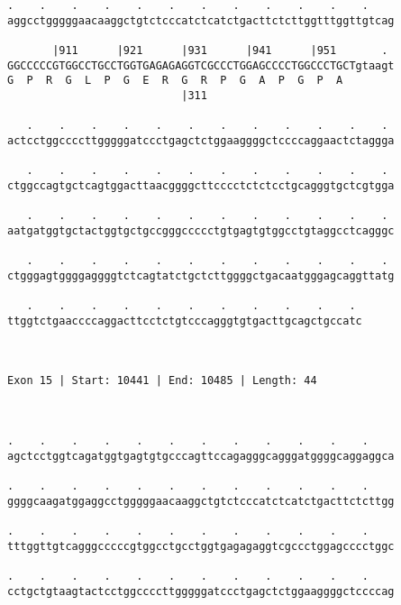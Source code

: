 \documentclass{article}
\begin{document}
\begin{Verbatim}
.    .    .    .    .    .    .    .    .    .    .    .    
aggcctgggggaacaaggctgtctcccatctcatctgacttctcttggtttggttgtcag
                                                            
       |911      |921      |931      |941      |951       . 
GGCCCCCGTGGCCTGCCTGGTGAGAGAGGTCGCCCTGGAGCCCCTGGCCCTGCTgtaagt
G  P  R  G  L  P  G  E  R  G  R  P  G  A  P  G  P  A        
                           |311                             
  
   .    .    .    .    .    .    .    .    .    .    .    . 
actcctggccccttgggggatccctgagctctggaaggggctccccaggaactctaggga
                                                            
   .    .    .    .    .    .    .    .    .    .    .    . 
ctggccagtgctcagtggacttaacggggcttcccctctctcctgcagggtgctcgtgga
                                                            
   .    .    .    .    .    .    .    .    .    .    .    . 
aatgatggtgctactggtgctgccgggccccctgtgagtgtggcctgtaggcctcagggc
                                                            
   .    .    .    .    .    .    .    .    .    .    .    . 
ctgggagtggggaggggtctcagtatctgctcttggggctgacaatgggagcaggttatg
                                                            
   .    .    .    .    .    .    .    .    .    .    . 
ttggtctgaaccccaggacttcctctgtcccagggtgtgacttgcagctgccatc
                                                       
                                                       
 
Exon 15 | Start: 10441 | End: 10485 | Length: 44



.    .    .    .    .    .    .    .    .    .    .    .    
agctcctggtcagatggtgagtgtgcccagttccagagggcagggatggggcaggaggca
                                                            
.    .    .    .    .    .    .    .    .    .    .    .    
ggggcaagatggaggcctgggggaacaaggctgtctcccatctcatctgacttctcttgg
                                                            
.    .    .    .    .    .    .    .    .    .    .    .    
tttggttgtcagggcccccgtggcctgcctggtgagagaggtcgccctggagcccctggc
                                                            
.    .    .    .    .    .    .    .    .    .    .    .    
cctgctgtaagtactcctggccccttgggggatccctgagctctggaaggggctccccag
                                                            

\end{Verbatim}
\end{document}
